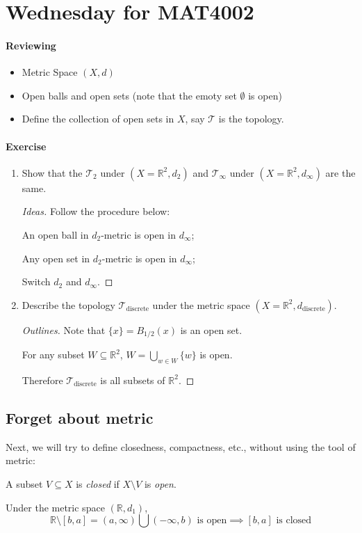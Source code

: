 \section{Wednesday for MAT4002}
\paragraph{Reviewing}
\begin{itemize}
\item
Metric Space $(X,d)$
\item
Open balls and open sets (note that the emoty set $\emptyset$ is open)
\item
Define the collection of open sets in $X$, say $\mathcal{T}$ is the topology.
\end{itemize}
\paragraph{Exercise}
\begin{enumerate}
\item
Show that the $\mathcal{T}_2$ under $(X=\mathbb{R}^2,d_2)$ and $\mathcal{T}_\infty$ under $(X=\mathbb{R}^2,d_\infty)$ are the same.
\begin{proof}[Ideas]
Follow the procedure below:

An open ball in $d_2$-metric is open in $d_\infty$; 

Any open set in $d_2$-metric is open in $d_\infty$;

Switch $d_2$ and $d_\infty$.
\end{proof}
\item
Describe the topology $\mathcal{T}_{\text{discrete}}$ under the metric space $(X=\mathbb{R}^2,d_{\text{discrete}})$.
\begin{proof}[Outlines]
Note that $\{x\}=B_{1/2}(x)$ is an open set.

For any subset $W\subseteq\mathbb{R}^2$, $W=\bigcup_{w\in W}\{w\}$ is open.

Therefore $\mathcal{T}_{\text{discrete}}$ is all subsets of $\mathbb{R}^2$.
\end{proof}
\end{enumerate}
\subsection{Forget about metric}
Next, we will try to define closedness, compactness, etc., without using the tool of metric:
\begin{definition}[closed]
A subset $V\subseteq X$ is \emph{closed} if $X\setminus V$ is \emph{open}.
\end{definition}
\begin{example}
Under the metric space $(\mathbb{R},d_1)$, 
\[
\mathbb{R}\setminus [b,a]=(a,\infty)\bigcup(-\infty,b)
\mbox{ is open}\implies
[b,a]\mbox{ is closed}
\]
\end{example}

